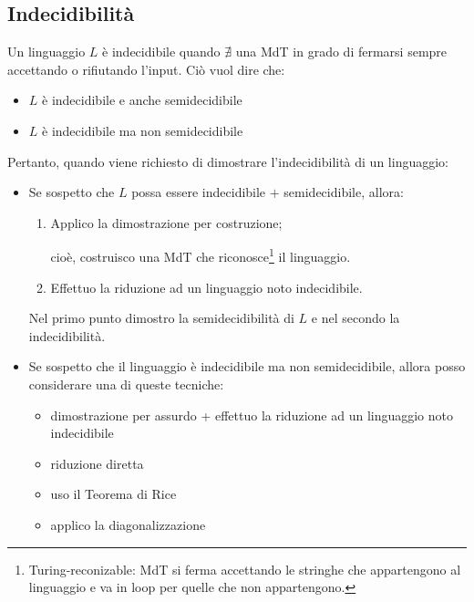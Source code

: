 \documentclass{article}  %
\theoremstyle{definition}
\begin{document}
\subsection{Indecidibilità}
Un linguaggio $L$ è indecidibile quando $\nexists$ una MdT in grado di fermarsi sempre accettando o rifiutando l'input. Ciò vuol dire che:
\begin{itemize}
	\item $L$ è indecidibile e anche semidecidibile
	\item $L$ è indecidibile ma non semidecidibile
\end{itemize}
Pertanto, quando viene richiesto di dimostrare l'indecidibilità di un linguaggio:
\begin{itemize}
	\item Se sospetto che $L$ possa essere indecidibile $+$ semidecidibile, allora:
	      \begin{enumerate}
		      \item Applico la dimostrazione per costruzione;

		            cioè, costruisco una MdT che riconosce\footnote{Turing-reconizable: MdT si ferma accettando le stringhe che appartengono al linguaggio e va in loop
			            per quelle che non appartengono.} il linguaggio.
		      \item Effettuo la riduzione ad un linguaggio noto indecidibile.
	      \end{enumerate}
	      Nel primo punto dimostro la semidecidibilità di $L$ e nel secondo la indecidibilità.
	\item Se sospetto che il linguaggio è indecidibile ma non semidecidibile, allora posso considerare una di queste tecniche:
	      \begin{center}
	      \end{center}

	      \begin{itemize}
		      \item dimostrazione per assurdo + effettuo la riduzione ad un linguaggio noto indecidibile
		      \item riduzione diretta
		      \item uso il Teorema di Rice
		      \item applico la diagonalizzazione
	      \end{itemize}
\end{itemize}
\end{document}
